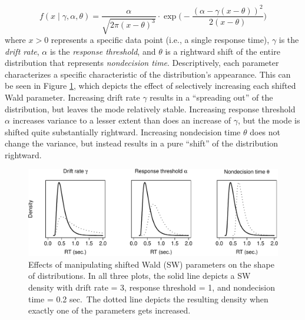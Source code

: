 \documentclass[english,man]{apa6}
\theoremstyle{definition}
\theoremstyle{definition}
\theoremstyle{definition}
\theoremstyle{remark}
\begin{document}
\[
f(x \mid \gamma,\alpha,\theta) = \frac{\alpha}{\sqrt{2\pi(x-\theta)^3}}\cdot \exp\Biggl(-\frac{(\alpha-\gamma(x-\theta))^2}{2(x-\theta)}\Biggr)
\] where \(x>0\) represents a specific data point (i.e., a single
response time), \(\gamma\) is the \emph{drift rate}, \(\alpha\) is the
\emph{response threshold}, and \(\theta\) is a rightward shift of the
entire distribution that represents \emph{nondecision time}.
Descriptively, each parameter characterizes a specific characteristic of
the distribution's appearance. This can be seen in Figure
\ref{fig:swParameters}, which depicts the effect of selectively
increasing each shifted Wald parameter. Increasing drift rate \(\gamma\)
results in a \enquote{spreading out} of the distribution, but leaves the
mode relatively stable. Increasing response threshold \(\alpha\)
increases variance to a lesser extent than does an increase of
\(\gamma\), but the mode is shifted quite substantially rightward.
Increasing nondecision time \(\theta\) does not change the variance, but
instead results in a pure \enquote{shift} of the distribution rightward.

\begin{figure}
\centering
\includegraphics{paper_files/figure-latex/swParameters-1.pdf}
\caption{\label{fig:swParameters}Effects of manipulating shifted Wald (SW)
parameters on the shape of distributions. In all three plots, the solid
line depicts a SW density with drift rate = 3, response threshold = 1,
and nondecision time = 0.2 sec.~The dotted line depicts the resulting
density when exactly one of the parameters gets increased.}
\end{figure}
\end{document}
